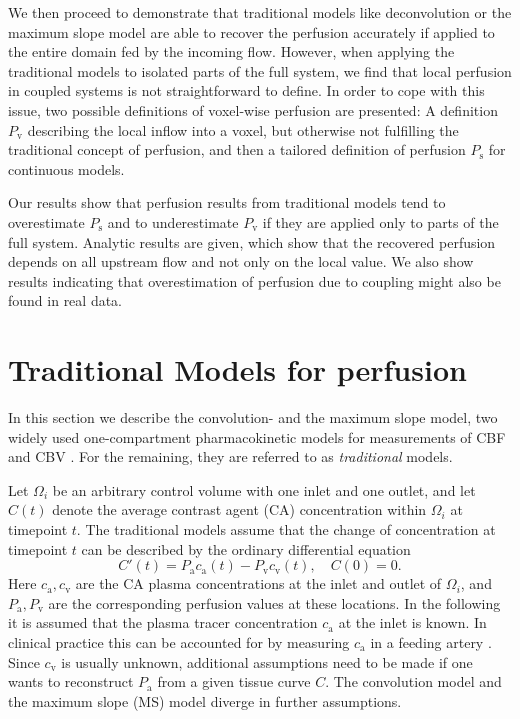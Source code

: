\documentclass[journal,twocolumn]{IEEEtran}
\newcommand{\ca}{c_\mathrm{a}}
\newcommand{\cout}{c_{\mathrm{v}}}
\newcommand{\Pa}{P_{\mathrm{a}}}
\newcommand{\Pout}{P_{\mathrm{v}}}
\newcommand{\Perfv}{P_{\mathrm{v}}}
\newcommand{\Perfs}{P_{\mathrm{s}}}
\begin{document}
	We then proceed to demonstrate that traditional models like deconvolution or the maximum slope model are able to recover the perfusion accurately if applied to the entire domain fed by the incoming flow.
	However, when applying the traditional models to isolated parts of the full system, we find that local perfusion in coupled systems is not straightforward to define.
	In order to cope with this issue, two possible definitions of voxel-wise perfusion are presented: A definition $\Perfv$ describing the local inflow into a voxel, but otherwise not fulfilling the traditional concept of perfusion, and then a tailored definition of perfusion $\Perfs$ for continuous models.
	
	Our results show that perfusion results from traditional models tend to overestimate $\Perfs$ and to underestimate $\Perfv$ if they are applied only to parts of the full system.
	Analytic results are given, which show that the recovered perfusion depends on all upstream flow and not only on the local value.
	We also show results indicating that overestimation of perfusion due to coupling might also be found in real data.
	
	
	\section{Traditional Models for perfusion} \label{sec:traditional}

	In this section we describe the convolution- and the maximum slope model, two widely used one-compartment pharmacokinetic models for measurements of CBF and CBV \cite{Feng2013,Chen2011,kudo10}.
	For the remaining, they are referred to as \emph{traditional} models.
	
	Let $\Omega_i$ be an arbitrary control volume with one inlet and one outlet, and let $C(t)$ denote the average contrast agent (CA) concentration within $\Omega_i$ at timepoint $t$.
	The traditional models assume that the change of concentration at timepoint $t$ can be described by the ordinary differential equation 
	\begin{equation}\label{eq:classicgeneral}
		C'(t) = \Pa\ca(t) - \Pout\cout(t), \quad C(0) = 0.
	\end{equation}
	Here $\ca,\cout$ are the CA plasma concentrations at the inlet and outlet of $\Omega_i$, and $\Pa,\Pout$ are the corresponding perfusion values at these locations.
	In the following it is assumed that the plasma tracer concentration $\ca$ at the inlet is known.
	In clinical practice this can be accounted for by measuring $\ca$ in a feeding artery \cite{ostergaard96}.
	Since $\cout$ is usually unknown, additional assumptions need to be made if one wants to reconstruct $\Pa$ from a given tissue curve $C$. The convolution model and the maximum slope (MS) model diverge in further assumptions.
	
\end{document}
